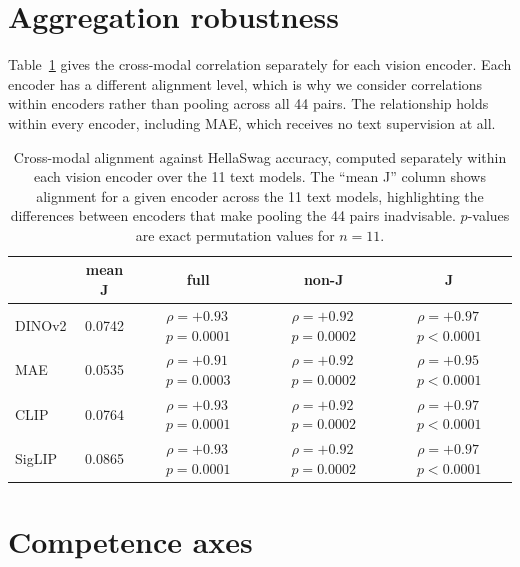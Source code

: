 \documentclass{article}
\begin{document}

\appendix

\section{Aggregation robustness}
\label{app:aggregation}

Table~\ref{tab:perencoder} gives the cross-modal correlation separately for
each vision encoder. Each encoder has a different alignment level, which is why we consider correlations within encoders rather than pooling across all 44 pairs. The relationship holds within every encoder, including MAE,
which receives no text supervision at all. 

\begin{table}[h]
  \centering
  \small
  \caption{Cross-modal alignment against HellaSwag accuracy, computed separately within each vision encoder over the 11 text models. The ``mean J'' column shows alignment for a given encoder across the 11 text models, highlighting the differences between encoders that make pooling the 44 pairs inadvisable. $p$-values are exact permutation values for $n=11$.}
  \label{tab:perencoder}
  \begin{tabular}{lcccc}
    \toprule
             & mean J & full                                 & non-J                                 & J                                    \\
    \midrule
    DINOv2  & 0.0742 & $\rho = +0.93$\,{\tiny$p = 0.0001$} & $\rho = +0.92$\,{\tiny$p = 0.0002$} & $\rho = +0.97$\,{\tiny$p < 0.0001$} \\
    MAE     & 0.0535 & $\rho = +0.91$\,{\tiny$p = 0.0003$} & $\rho = +0.92$\,{\tiny$p = 0.0002$} & $\rho = +0.95$\,{\tiny$p < 0.0001$} \\
    CLIP    & 0.0764 & $\rho = +0.93$\,{\tiny$p = 0.0001$} & $\rho = +0.92$\,{\tiny$p = 0.0002$} & $\rho = +0.97$\,{\tiny$p < 0.0001$} \\
    SigLIP  & 0.0865 & $\rho = +0.93$\,{\tiny$p = 0.0001$} & $\rho = +0.92$\,{\tiny$p = 0.0002$} & $\rho = +0.97$\,{\tiny$p < 0.0001$} \\
    \bottomrule
  \end{tabular}
\end{table}

\section{Competence axes}
\label{app:competence}
\end{document}
